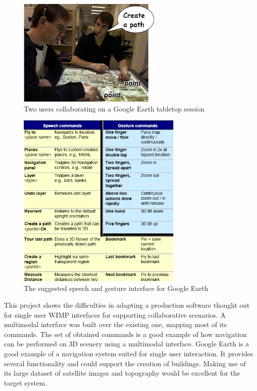 \begin{figure}[!ht]
    \centering
    \includegraphics[width=7cm]{gfx/sp-gest-ttop.png}
    \caption{Two users collaborating on a Google Earth tabletop session}
    \label{FIG-SP-TABLETOP}
\end{figure}

\begin{figure}[!ht]
    \centering
    \includegraphics[width=8cm]{gfx/sp-gest-ttop2.png}
    \caption{The suggested speech and gesture interface for Google Earth}
    \label{FIG-SP-TABLETOP2}
\end{figure}


This project shows the difficulties in adapting a production software thought out
for single user WIMP interfaces for supporting collaborative scenarios.
A multimodal interface was built over the existing one, mapping most of its commands.
The set of obtained commands is a good example of how navigation can be performed on
3D scenery using a multimodal interface.
Google Earth is a good example of a navigation system suited for single user interaction.
It provides several functionality and could support the creation of buildings.
Making use of its large dataset of satellite images and topography would be excellent
for the target system.


